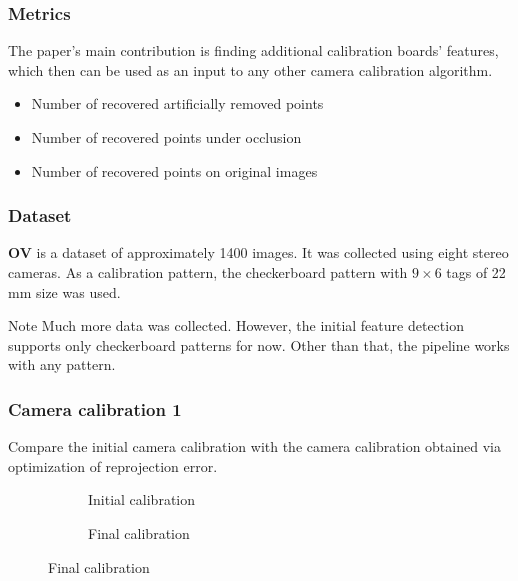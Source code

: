 \documentclass{beamer}
\begin{document}
\begin{frame}
	\frametitle{Metrics}
	The paper's main contribution is finding additional calibration boards' features, which
	then can be used as an input to any other camera calibration algorithm.

	\begin{itemize}
		\item Number of recovered artificially removed points
		\item Number of recovered points under occlusion
		\item Number of recovered points on original images
	\end{itemize}

\end{frame}

\begin{frame}
	\frametitle{Dataset}
	\textbf{OV} \citep{lochmanBabelCalibUniversalApproach2021} is a dataset of
	approximately 1400 images. It was collected using eight stereo cameras.
	As a calibration pattern, the checkerboard pattern with \(9\times 6\) tags of 22 mm size
	was used.

	\begin{alertblock}{Note}
		Much more data was collected. However, the initial feature detection
		supports only checkerboard patterns for now. Other than that, the pipeline
		works with any pattern.
	\end{alertblock}
\end{frame}

\begin{frame}
	\frametitle{Camera calibration 1}
	Compare the initial camera calibration with the camera calibration obtained via
	optimization of reprojection error.

	\begin{figure}
		\begin{subfigure}{0.45\linewidth}
			\caption{Initial calibration}
		\end{subfigure}
		\hfill
		\begin{subfigure}{0.45\linewidth}
			\caption{Final calibration}
		\end{subfigure}
	\end{figure}
\end{frame}
\end{document}
